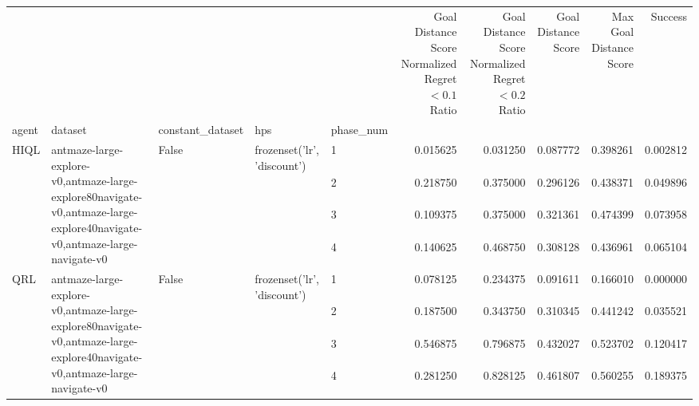 \begin{tabular}{lllllrrrrr}
\toprule
 &  &  &  &  & Goal Distance Score Normalized Regret $< 0.1$ Ratio & Goal Distance Score Normalized Regret $< 0.2$ Ratio & Goal Distance Score & Max Goal Distance Score & Success \\
agent & dataset & constant_dataset & hps & phase_num &  &  &  &  &  \\
\midrule
\multirow[t]{4}{*}{HIQL} & \multirow[t]{4}{*}{antmaze-large-explore-v0,antmaze-large-explore80navigate-v0,antmaze-large-explore40navigate-v0,antmaze-large-navigate-v0} & \multirow[t]{4}{*}{False} & \multirow[t]{4}{*}{frozenset({'lr', 'discount'})} & 1 & 0.015625 & 0.031250 & 0.087772 & 0.398261 & 0.002812 \\
 &  &  &  & 2 & 0.218750 & 0.375000 & 0.296126 & 0.438371 & 0.049896 \\
 &  &  &  & 3 & 0.109375 & 0.375000 & 0.321361 & 0.474399 & 0.073958 \\
 &  &  &  & 4 & 0.140625 & 0.468750 & 0.308128 & 0.436961 & 0.065104 \\
\cline{1-10} \cline{2-10} \cline{3-10} \cline{4-10}
\multirow[t]{4}{*}{QRL} & \multirow[t]{4}{*}{antmaze-large-explore-v0,antmaze-large-explore80navigate-v0,antmaze-large-explore40navigate-v0,antmaze-large-navigate-v0} & \multirow[t]{4}{*}{False} & \multirow[t]{4}{*}{frozenset({'lr', 'discount'})} & 1 & 0.078125 & 0.234375 & 0.091611 & 0.166010 & 0.000000 \\
 &  &  &  & 2 & 0.187500 & 0.343750 & 0.310345 & 0.441242 & 0.035521 \\
 &  &  &  & 3 & 0.546875 & 0.796875 & 0.432027 & 0.523702 & 0.120417 \\
 &  &  &  & 4 & 0.281250 & 0.828125 & 0.461807 & 0.560255 & 0.189375 \\
\cline{1-10} \cline{2-10} \cline{3-10} \cline{4-10}
\bottomrule
\end{tabular}
